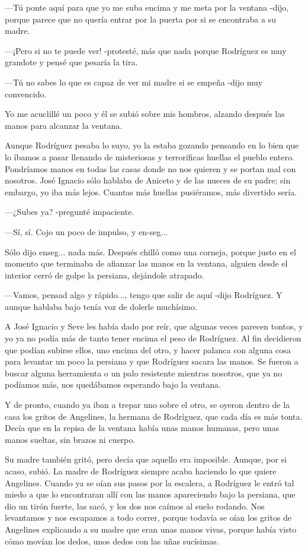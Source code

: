 \documentclass{barcodevapor3pags}
\begin{document}
---Tú ponte aquí para que yo me suba encima y me meta por la ventana
-dijo, porque parece que no quería entrar por la puerta por si se
encontraba a su madre.~

---¡Pero si no te puede ver! -protesté, más que nada porque Rodríguez es
muy grandote y pensé que pesaría la tira.~

---Tú no sabes lo que es capaz de ver mi madre si se empeña -dijo muy
convencido.~

Yo me acuclillé un poco y él se subió sobre mis hombros, alzando después
las manos para alcanzar la ventana.


\capitulo
{\Large A}unque Rodríguez pesaba lo suyo, yo la estaba gozando pensando en lo bien
que lo íbamos a pasar llenando de misteriosas y terroríficas huellas el
pueblo entero. Pondríamos manos en todas las casas donde no nos quieren
y se portan mal con nosotros. José Ignacio sólo hablaba de Aniceto y de
las nueces de su padre; sin embargo, yo iba más lejos. Cuantas más
huellas pusiéramos, más divertido sería.

---¿Subes ya? -pregunté impaciente.~

---Sí, sí. Cojo un poco de impulso, y en-seg...~

Sólo dijo enseg... nada más. Después chilló como una corneja, porque
justo en el momento que terminaba de afianzar las manos en la ventana,
alguien desde el interior cerró de golpe la persiana, dejándole
atrapado.~

---Vamos, pensad algo y rápido..., tengo que salir de aquí -dijo
Rodríguez. Y aunque hablaba bajo tenía voz de dolerle muchísimo.~

A José Ignacio y Seve les había dado por reír, que algunas veces parecen
tontos, y yo ya no podía más de tanto tener encima el peso de Rodríguez.
Al fin decidieron que podían subirse ellos, uno encima del otro, y hacer
palanca con alguna cosa para levantar un poco la persiana y que
Rodríguez sacara las manos. Se fueron a buscar alguna herramienta o un
palo resistente mientras nosotros, que ya no podíamos más, nos
quedábamos esperando bajo la ventana.~

Y de pronto, cuando ya iban a trepar uno sobre el otro, se oyeron dentro
de la casa los gritos de Angelines, la hermana de Rodríguez, que cada
día es más tonta. Decía que en la repisa de la ventana había unas manos
humanas, pero unas manos sueltas, sin brazos ni cuerpo.~

Su madre también gritó, pero decía que aquello era imposible. Aunque,
por si acaso, subió. La madre de Rodríguez siempre acaba haciendo lo que
quiere Angelines. Cuando ya se oían sus pasos por la escalera, a
Rodríguez le entró tal miedo a que lo encontraran allí con las manos
apareciendo bajo la persiana, que dio un tirón fuerte, las sacó, y los
dos nos caímos al suelo rodando. Nos levantamos y nos escapamos a todo
correr, porque todavía se oían los gritos de Angelines explicando a su
madre que eran unas manos vivas, porque había visto cómo movían los
dedos, unos dedos con las uñas sucísimas.~
\end{document}
